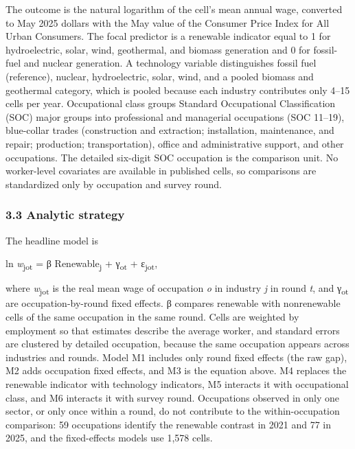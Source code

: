 \documentclass[
  11pt,
]{article}
\begin{document}
The outcome is the natural logarithm of the cell's mean annual wage,
converted to May 2025 dollars with the May value of the Consumer Price
Index for All Urban Consumers. The focal predictor is a renewable
indicator equal to 1 for hydroelectric, solar, wind, geothermal, and
biomass generation and 0 for fossil-fuel and nuclear generation. A
technology variable distinguishes fossil fuel (reference), nuclear,
hydroelectric, solar, wind, and a pooled biomass and geothermal
category, which is pooled because each industry contributes only 4--15
cells per year. Occupational class groups Standard Occupational
Classification (SOC) major groups into professional and managerial
occupations (SOC 11--19), blue-collar trades (construction and
extraction; installation, maintenance, and repair; production;
transportation), office and administrative support, and other
occupations. The detailed six-digit SOC occupation is the comparison
unit. No worker-level covariates are available in published cells, so
comparisons are standardized only by occupation and survey round.

\subsubsection{3.3 Analytic strategy}\label{analytic-strategy}

The headline model is

ln \emph{w}\textsubscript{jot} = β Renewable\textsubscript{j} +
γ\textsubscript{ot} + ε\textsubscript{jot},

where \emph{w}\textsubscript{jot} is the real mean wage of occupation
\emph{o} in industry \emph{j} in round \emph{t}, and γ\textsubscript{ot}
are occupation-by-round fixed effects. β compares renewable with
nonrenewable cells of the same occupation in the same round. Cells are
weighted by employment so that estimates describe the average worker,
and standard errors are clustered by detailed occupation, because the
same occupation appears across industries and rounds. Model M1 includes
only round fixed effects (the raw gap), M2 adds occupation fixed
effects, and M3 is the equation above. M4 replaces the renewable
indicator with technology indicators, M5 interacts it with occupational
class, and M6 interacts it with survey round. Occupations observed in
only one sector, or only once within a round, do not contribute to the
within-occupation comparison: 59 occupations identify the renewable
contrast in 2021 and 77 in 2025, and the fixed-effects models use 1,578
cells.
\end{document}
